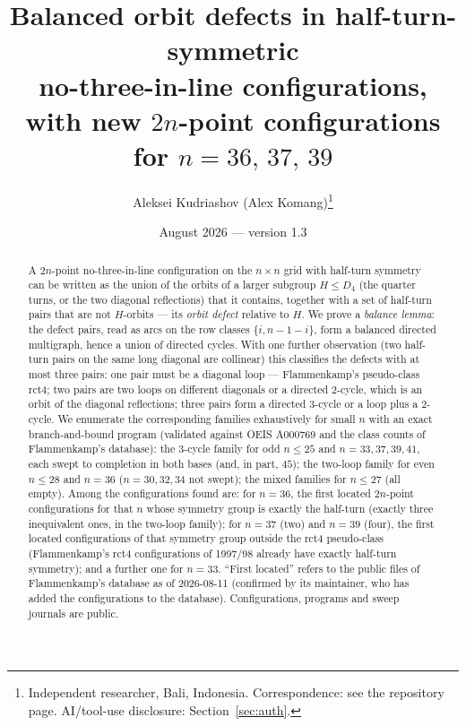 \documentclass[11pt]{article}
\title{Balanced orbit defects in half-turn-symmetric\\ no-three-in-line configurations,\\
with new $2n$-point configurations for $n=36,\,37,\,39$}
\author{Aleksei Kudriashov (Alex Komang)\thanks{Independent researcher, Bali, Indonesia.  Correspondence: see the repository page.
AI/tool-use disclosure: Section~\ref{sec:auth}.}}
\date{August 2026 --- version 1.3}
\theoremstyle{remark}
\newcommand{\Dfour}{D_4}
\begin{document}
\maketitle

\begin{abstract}
A $2n$-point no-three-in-line configuration on the $n\times n$ grid with half-turn symmetry can be written as the union
of the orbits of a larger subgroup $H\le\Dfour$ (the quarter turns, or the two diagonal reflections) that it contains,
together with a set of half-turn pairs that are not $H$-orbits --- its \emph{orbit defect} relative to $H$.  We prove a
\emph{balance lemma}: the defect pairs, read as arcs on the row classes $\{i,n-1-i\}$, form a balanced directed
multigraph, hence a union of directed cycles.  With one further observation (two half-turn pairs on the same long
diagonal are collinear) this classifies the defects with at most three pairs: one pair must be a diagonal loop ---
Flammenkamp's pseudo-class rct4; two pairs are two loops on different diagonals or a directed $2$-cycle, which is an
orbit of the diagonal reflections; three pairs form a directed $3$-cycle or a loop plus a $2$-cycle.  We enumerate the
corresponding families exhaustively for small $n$ with an exact branch-and-bound program (validated against OEIS A000769
and the class counts of Flammenkamp's database): the $3$-cycle family for odd $n\le25$ and $n=33,37,39,41$, each swept to completion in both bases (and, in part, $45$); the two-loop family for even $n\le28$ and $n=36$ ($n=30,32,34$ not swept); the mixed families for $n\le27$ (all empty).  Among the
configurations found are: for $n=36$, the first located $2n$-point configurations for that $n$ whose symmetry group is exactly the
half-turn (exactly three inequivalent ones, in the two-loop family); for $n=37$ (two) and $n=39$ (four), the first located configurations of that
symmetry group outside the rct4 pseudo-class (Flammenkamp's rct4 configurations of 1997/98 already have exactly
half-turn symmetry); and a further one for $n=33$.  ``First located'' refers to the public files of Flammenkamp's
database as of 2026-08-11 (confirmed by its maintainer, who has added the configurations to the database).  Configurations,
programs and sweep journals are public.
\end{abstract}
\end{document}
